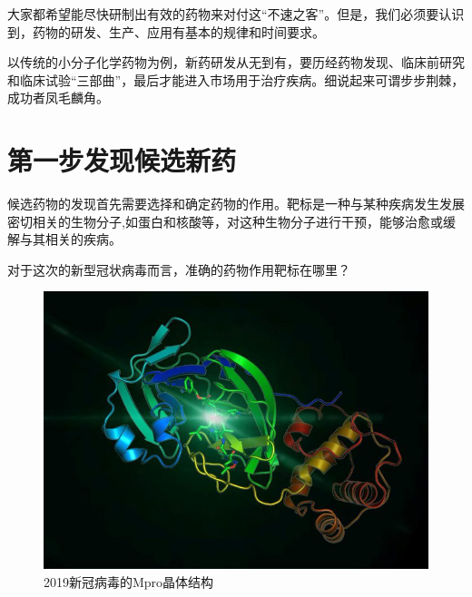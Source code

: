 \begin{multicols}{3}

大家都希望能尽快研制出有效的药物来对付这“不速之客”。但是，我们必须要认识到，药物的研发、生产、应用有基本的规律和时间要求。
                                             
 


以传统的小分子化学药物为例，新药研发从无到有，要历经药物发现、临床前研究和临床试验“三部曲”，最后才能进入市场用于治疗疾病。细说起来可谓步步荆棘，成功者凤毛麟角。



\section*{第一步\quad 发现候选新药}

候选药物的发现首先需要选择和确定药物的作用。靶标是一种与某种疾病发生发展密切相关的生物分子,如蛋白和核酸等，对这种生物分子进行干预，能够治愈或缓解与其相关的疾病。

对于这次的新型冠状病毒而言，准确的药物作用靶标在哪里？

\begin{figure}[H]
    \centering
    \includegraphics[width=\linewidth]{IMG/202001/ncovmpro.jpg}
    \caption{\kaishu 2019新冠病毒的Mpro晶体结构}
    \label{fig:my_label}
\end{figure}


\end{multicols}
